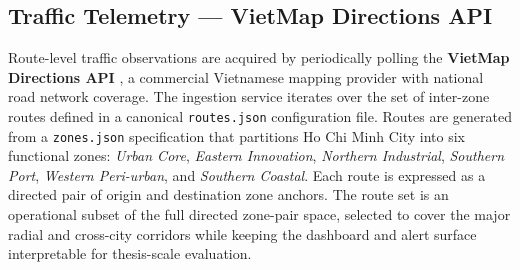   \subsection{Traffic Telemetry — VietMap Directions API}
  \label{subsec:vietmap}                                                                                                                                  
                                                                                                                                                          
  Route-level traffic observations are acquired by periodically polling the
  \textbf{VietMap Directions API} \cite{vietmap_api}, a commercial Vietnamese                                                                             
  mapping provider with national road network coverage. The ingestion service                                                                             
  iterates over the set of inter-zone routes defined in a canonical                                                                                      
  \texttt{routes.json} configuration file. Routes are generated from a                                                                                    
  \texttt{zones.json} specification that partitions Ho Chi Minh City into six                                                                             
  functional zones: \textit{Urban Core}, \textit{Eastern Innovation},                                                                                     
  \textit{Northern Industrial}, \textit{Southern Port},                                                                                                   
  \textit{Western Peri-urban}, and \textit{Southern Coastal}. Each route is                                                                               
  expressed as a directed pair of origin and destination zone anchors.                                                                                    
  The route set is an operational subset of the full directed zone-pair                                                                                   
  space, selected to cover the major radial and cross-city corridors while                                                                                
  keeping the dashboard and alert surface interpretable for thesis-scale                                                                                  
  evaluation.                                                                                    
                                                                                                                                                          
